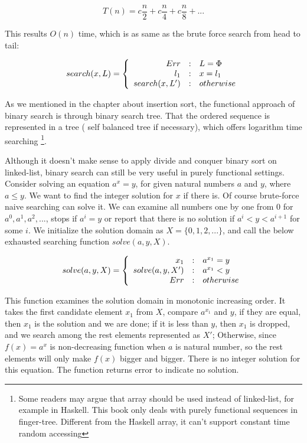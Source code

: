 \documentclass[UTF8]{article}
\begin{document}
\[
T(n) = c \frac{n}{2} + c \frac{n}{4} + c \frac{n}{8} + ...
\]

This results $O(n)$ time, which is as same as the brute force search from head to tail:

\[
search(x, L) = \left \{
  \begin{array}
  {r@{\quad:\quad}l}
  Err & L = \Phi \\
  l_1 & x = l_1 \\
  search(x, L') & otherwise
  \end{array}
\right.
\]

As we mentioned in the chapter about insertion sort, the functional approach of binary search
is through binary search tree. That the ordered sequence is represented in a tree (
self balanced tree if necessary), which offers logarithm time searching \footnote{Some readers
may argue that array should be used instead of linked-list, for example in Haskell. This book
only deals with purely functional sequences in finger-tree. Different from the
Haskell array, it can't support constant time random accessing}.

Although it doesn't make sense to apply divide and conquer binary sort on linked-list, binary
search can still be very useful in purely functional settings. Consider solving an equation
$a^x = y$, for given natural numbers $a$ and $y$, where $a \leq y$. We want to find the
integer solution for $x$ if there is. Of course brute-force naive searching can solve it.
We can examine all numbers one by one from 0 for $a^0, a^1, a^2, ...$, stops if
$a^i = y$ or report that there is no solution if $a^i < y < a^{i+1}$ for some $i$.
We initialize the solution domain as $X = \{0, 1, 2, ...\}$, and call the below
exhausted searching function $solve(a, y, X)$.

\[
solve(a, y, X) = \left \{
  \begin{array}
  {r@{\quad:\quad}l}
  x_1 & a^{x_1} = y \\
  solve(a, y, X') & a^{x_1} < y \\
  Err & otherwise
  \end{array}
\right.
\]

This function examines the solution domain in monotonic increasing order. It takes the first
candidate element $x_1$ from $X$, compare $a^{x_1}$ and $y$, if they are equal, then $x_1$ is
the solution and we are done; if it is less than $y$, then $x_1$ is dropped, and we search
among the rest elements represented as $X'$; Otherwise, since $f(x) = a^x$ is non-decreasing function
when $a$ is natural number, so the rest elements will only make $f(x)$ bigger and bigger.
There is no integer solution for this equation. The function returns error to indicate
no solution.
\end{document}

